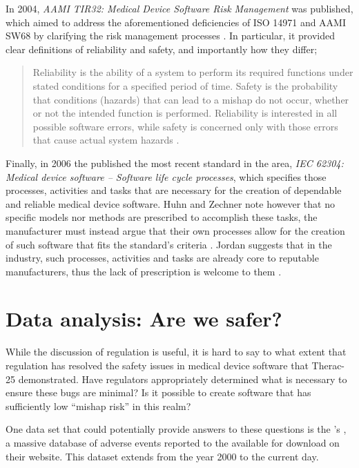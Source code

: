 \documentclass{cshonours}
\newcommand{\ther}{Therac-25\xspace}
\begin{document}
In 2004, \textit{AAMI TIR32: Medical Device Software Risk Management} was published, which aimed to address the aforementioned deficiencies of ISO 14971 and AAMI SW68 by clarifying the risk management processes \cite{rakitin2006coping}. In particular, it provided clear definitions of reliability and safety, and importantly how they differ;
\begin{quote}
Reliability is the ability of a system to perform its required functions under stated conditions for a specified period of time. Safety is the probability that conditions (hazards) that can lead to a mishap do not occur, whether or not the intended function is performed. Reliability is interested in all possible software errors, while safety is concerned only with those errors that cause actual system hazards \cite{aamitir32}.
\end{quote}

Finally, in 2006 the \iec published the most recent standard in the area, \textit{IEC 62304: Medical device software -- Software life cycle processes}, which specifies those processes, activities and tasks that are necessary for the creation of dependable and reliable medical device software. Huhn and Zechner note however that no specific models nor methods are prescribed to accomplish these tasks, the manufacturer must instead argue that their own processes allow for the creation of such software that fits the standard's criteria \cite{huhn2010arguing}. Jordan suggests that in the industry, such processes, activities and tasks are already core to reputable manufacturers, thus the lack of prescription is welcome to them \cite{jordan2006standard}.


\chapter{Data analysis: Are we safer?}
\label{chap:data}
While the discussion of regulation is useful, it is hard to say to what extent that regulation has resolved the safety issues in medical device software that \ther demonstrated. Have regulators appropriately determined what is necessary to ensure these bugs are minimal? Is it possible to create software that has sufficiently low ``mishap risk'' in this realm?

One data set that could potentially provide answers to these questions is the \fda's \maude, a massive database of adverse events reported to the \fda available for download on their website. This dataset extends from the year 2000 to the current day.
\end{document}
